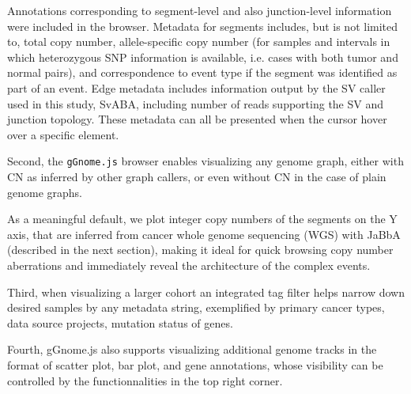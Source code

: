 \documentclass[phd,tocprelim]{cornell}
\begin{document}
Annotations corresponding to segment-level and also junction-level information were included in the browser. Metadata for segments includes, but is not limited to, total copy number, allele-specific copy number (for samples and intervals in which heterozygous SNP information is available, i.e. cases with both tumor and normal pairs), and correspondence to event type if the segment was identified as part of an event. Edge metadata includes information output by the SV caller used in this study, SvABA, including number of reads supporting the SV and junction topology. These metadata can all be presented when the cursor hover over a specific element.

Second, the \texttt{gGnome.js} browser enables visualizing any genome graph, either with CN as inferred by other graph callers, or even without CN in the case of plain genome graphs. 

As a meaningful default, we plot integer copy numbers of the segments on the Y axis, that are inferred from cancer whole genome sequencing (WGS) with JaBbA (described in the next section), making it ideal for quick browsing copy number aberrations and immediately reveal the architecture of the complex events. 


Third, when visualizing a larger cohort an integrated tag filter helps narrow down desired samples by any metadata string, exemplified by primary cancer types, data source projects, mutation status of genes.

Fourth, gGnome.js also supports visualizing additional genome tracks in the format of scatter plot, bar plot, and gene annotations, whose visibility can be controlled by the functionnalities in the top right corner.

\end{document}
